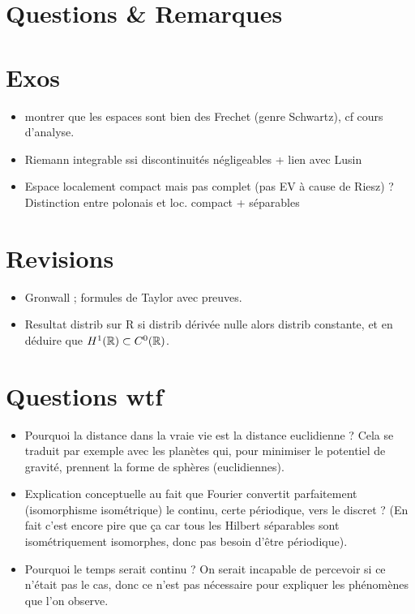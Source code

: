 \documentclass[11pt,a4paper]{article}
\begin{document}


\section{Questions \& Remarques}

\section{Exos}
\begin{itemize}
\item[-] montrer que les espaces sont bien des Frechet (genre Schwartz), cf cours d'analyse.
\item[-] Riemann integrable ssi discontinuités négligeables + lien avec Lusin
\item[-] Espace localement compact mais pas complet (pas EV à cause de Riesz) ? Distinction entre polonais et loc. compact + séparables 
\end{itemize}

\section{Revisions}
\begin{itemize}
\item[-] Gronwall ; formules de Taylor avec preuves.
\item[-] Resultat distrib sur R si distrib dérivée nulle alors distrib constante, et en déduire que $H^1(\mathbb R) \subset C^0(\mathbb R)$.
\end{itemize}

\section{Questions wtf}
\begin{itemize}
\item[-] Pourquoi la distance dans la vraie vie est la distance euclidienne ? Cela se traduit par exemple avec les planètes qui, pour minimiser le potentiel de gravité, prennent la forme de sphères (euclidiennes). \\
\item[-] Explication conceptuelle au fait que Fourier convertit parfaitement (isomorphisme isométrique) le continu, certe périodique, vers le discret ? (En fait c'est encore pire que ça car tous les Hilbert séparables sont isométriquement isomorphes, donc pas besoin d'être périodique).
\item[-] Pourquoi le temps serait continu ? On serait incapable de percevoir si ce n’était pas le cas, donc ce n’est pas nécessaire pour expliquer les phénomènes que l’on observe. 
\end{itemize}
\end{document}
